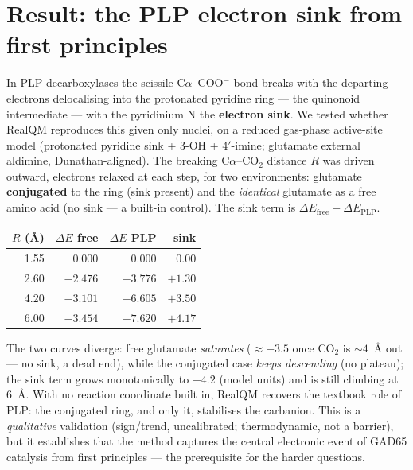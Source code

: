 \documentclass[11pt]{article}
\begin{document}
\section{Result: the PLP electron sink from first principles}
In PLP decarboxylases the scissile C$\alpha$--COO$^-$ bond breaks with the departing electrons delocalising
into the protonated pyridine ring --- the quinonoid intermediate --- with the pyridinium N the
\textbf{electron sink}. We tested whether RealQM reproduces this given only nuclei, on a reduced gas-phase
active-site model (protonated pyridine sink + 3-OH + 4$'$-imine; glutamate external aldimine, Dunathan-aligned).
The breaking C$\alpha$--CO$_2$ distance $R$ was driven outward, electrons relaxed at each step, for two
environments: glutamate \textbf{conjugated} to the ring (sink present) and the \emph{identical} glutamate as a
free amino acid (no sink --- a built-in control). The sink term is $\Delta E_{\text{free}}-\Delta E_{\text{PLP}}$.
\begin{center}
\begin{tabular}{rrrr}
\toprule
$R$ (\AA) & $\Delta E$ free & $\Delta E$ PLP & sink \\
\midrule
1.55 & $0.000$ & $0.000$ & $0.00$ \\
2.60 & $-2.476$ & $-3.776$ & $+1.30$ \\
4.20 & $-3.101$ & $-6.605$ & $+3.50$ \\
6.00 & $-3.454$ & $\mathbf{-7.620}$ & $\mathbf{+4.17}$ \\
\bottomrule
\end{tabular}
\end{center}
The two curves diverge: free glutamate \emph{saturates} (${\approx}-3.5$ once CO$_2$ is ${\sim}4$~\AA{} out ---
no sink, a dead end), while the conjugated case \emph{keeps descending} (no plateau); the sink term grows
monotonically to $+4.2$ (model units) and is still climbing at $6$~\AA. With no reaction coordinate built in,
RealQM recovers the textbook role of PLP: the conjugated ring, and only it, stabilises the carbanion. This is
a \emph{qualitative} validation (sign/trend, uncalibrated; thermodynamic, not a barrier), but it establishes
that the method captures the central electronic event of GAD65 catalysis from first principles --- the
prerequisite for the harder questions.
\end{document}
